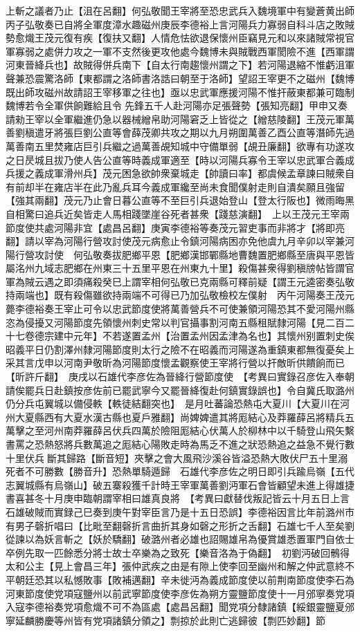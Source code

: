 上斬之議者乃止【沮在呂翻】何弘敬聞王宰將至恐忠武兵入魏境軍中有變蒼黄出師丙子弘敬奏已自將全軍度漳水趣磁州庚辰李德裕上言河陽兵力寡弱自科斗店之敗賊勢愈熾王茂元復有疾【復扶又翻】人情危怯欲退保懷州臣竊見元和以來諸賊常視官軍寡弱之處併力攻之一軍不支然後更攻他處今魏博未與賊戰西軍閡險不進【西軍謂河東晉絳兵也】故賊得併兵南下【自太行南趨懷州謂之下】若河陽退縮不惟虧沮軍聲兼恐震驚洛師【東都謂之洛師書洛誥曰朝至于洛師】望詔王宰更不之磁州【魏博既出師攻磁州故請詔王宰移軍之往也】亟以忠武軍應援河陽不惟扞蔽東都兼可臨制魏博若令全軍供餉難給且令先鋒五千人赴河陽亦足張聲勢【張知亮翻】甲申又奏請勑王宰以全軍繼進仍急以器械繒帛助河陽窘乏上皆從之【繒慈陵翻】王茂元軍萬善劉稹遣牙將張巨劉公直等會薛茂卿共攻之期以九月朔圍萬善乙酉公直等潛師先過萬善南五里焚雍店巨引兵繼之過萬善覘知城中守備單弱【覘丑廉翻】欲專有功遂攻之日昃城且拔乃使人告公直等時義成軍適至【時以河陽兵寡令王宰以忠武軍合義成兵援之義成軍滑州兵】茂元困急欲帥衆棄城走【帥讀曰率】都虞候孟章諫曰賊衆自有前却半在雍店半在此乃亂兵耳今義成軍纔至尚未食聞僕射走則自潰矣願且強留【強其兩翻】茂元乃止會日暮公直等不至巨引兵退始登山【登太行阪也】微雨晦黑自相驚曰追兵近矣皆走人馬相踐墜崖谷死者甚衆【踐慈演翻】　上以王茂元王宰兩節度使共處河陽非宜【處昌呂翻】庚寅李德裕等奏茂元習吏事而非將才【將即亮翻】請以宰為河陽行營攻討使茂元病愈止令鎮河陽病困亦免他虞九月辛卯以宰兼河陽行營攻討使　何弘敬奏拔肥鄉平恩【肥鄉漢邯鄲縣地曹魏置肥鄉縣至唐與平恩皆屬洺州九域志肥鄉在州東三十五里平恩在州東九十里】殺傷甚衆得劉稹牓帖皆謂官軍為賊云遇之即須痛殺癸巳上謂宰相何弘敬已克兩縣可釋前疑【謂王元逵密奏弘敬持兩端也】既有殺傷雖欲持兩端不可得已乃加弘敬檢校左僕射　丙午河陽奏王茂元薨李德裕奏王宰止可令以忠武節度使將萬善營兵不可使兼領河陽恐其不愛河陽州縣恣為侵擾又河陽節度先領懷州刺史常以判官攝事割河南五縣租賦隸河陽【見二百二十七卷德宗建中元年】不若遂置孟州【治置孟州因孟津為名也】其懷州别置刺史俟昭義平日仍割澤州隸河陽節度則太行之險不在昭義而河陽遂為重鎮東都無復憂矣上采其言戊申以河南尹敬昕為河陽節度懷孟觀察使王宰將行營以扞敵昕供饋餉而已【昕許斤翻】　庚戌以石雄代李彦佐為晉絳行營節度使　【考異曰實錄召彦佐入奉朝請俟罷兵日赴鎮按彦佐前已罷武寧今又罷晉絳復赴何鎮實錄誤也】令自冀氏取潞州仍分兵屯翼城以備侵軼【軼徒結翻突也】　是月吐蕃論恐熱屯大夏川【大夏川在河州大夏縣西有大夏水漢古縣也夏戶雅翻】尚婢婢遣其將厖結心及莽羅薛呂將精兵五萬擊之至河州南莽羅薛呂伏兵四萬於險阻厖結心伏萬人於柳林中以千騎登山飛矢繫書罵之恐熱怒將兵數萬追之厖結心陽敗走時為馬乏不進之狀恐熱追之益急不覺行數十里伏兵斷其歸路【斷音短】夾擊之會大風飛沙溪谷皆溢恐熱大敗伏尸五十里溺死者不可勝數【勝音升】恐熱單騎遁歸　石雄代李彦佐之明日即引兵踰烏嶺【五代志翼城縣有烏嶺山】破五寨殺獲千計時王宰軍萬善劉沔軍石會皆顧望未進上得雄捷書喜甚冬十月庚申臨朝謂宰相曰雄真良將　【考異曰獻替伐叛記皆云十月五日上言石雄破賊而實録己巳奏到庚午對宰臣言乃是十五日恐誤】李德裕因言比年前潞州市有男子磬折唱曰【比毗至翻磬折言曲折其身如磬之形折之舌翻】石雄七千人至矣劉從諫以為妖言斬之【妖於驕翻】破潞州者必雄也詔賜雄帛為優賞雄悉置軍門自依士卒例先取一匹餘悉分將士故士卒樂為之致死【樂音洛為于偽翻】　初劉沔破回鶻得太和公主【見上會昌三年】張仲武疾之由是有隙上使李回至幽州和解之仲武意終不平朝廷恐其以私憾敗事【敗補邁翻】辛未徙沔為義成節度使以前荆南節度使李石為河東節度使党項寇鹽州以前武寧節度使李彦佐為朔方靈鹽節度使十一月邠寧奏党項入寇李德裕奏党項愈熾不可不為區處【處昌呂翻】聞党項分隸諸鎮【綏銀靈鹽夏邠寧延麟勝慶等州皆有党項諸鎮分領之】剽掠於此則亡逃歸彼【剽匹妙翻】節